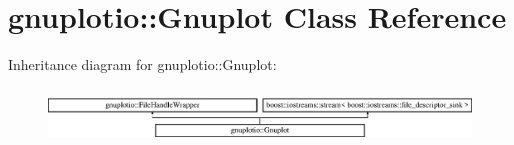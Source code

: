 \hypertarget{classgnuplotio_1_1Gnuplot}{}\section{gnuplotio\+:\+:Gnuplot Class Reference}
\label{classgnuplotio_1_1Gnuplot}
Inheritance diagram for gnuplotio\+:\+:Gnuplot\+:\begin{figure}[H]
\begin{center}
\leavevmode
\includegraphics[height=1.469816cm]{classgnuplotio_1_1Gnuplot}
\end{center}
\end{figure}
